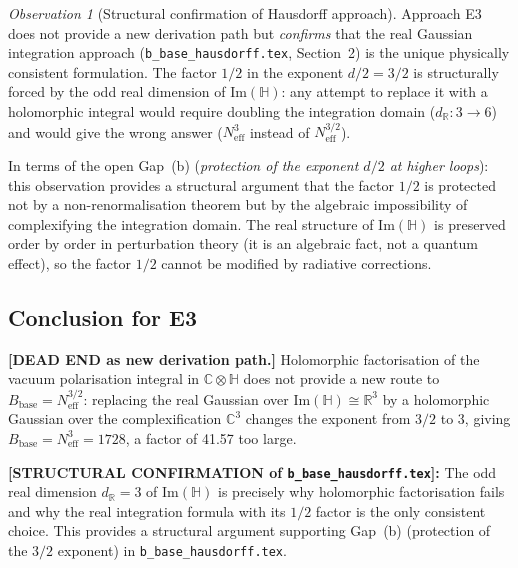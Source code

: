 \documentclass[11pt,a4paper]{article}
\theoremstyle{definition}
\theoremstyle{remark}
\newtheorem{observation}{Observation}
\begin{document}
\begin{observation}[Structural confirmation of Hausdorff approach]
\label{obs:E3_confirmation}
  Approach E3 does not provide a new derivation path but \emph{confirms}
  that the real Gaussian integration approach (\texttt{b\_base\_hausdorff.tex},
  Section~2) is the unique physically consistent formulation.
  The factor $1/2$ in the exponent $d/2 = 3/2$ is structurally forced
  by the odd real dimension of $\mathrm{Im}(\mathbb{H})$: any attempt to replace
  it with a holomorphic integral would require doubling the integration domain
  ($d_\mathbb{R}: 3 \to 6$) and would give the wrong answer ($N_{\mathrm{eff}}^3$
  instead of $N_{\mathrm{eff}}^{3/2}$).

  In terms of the open Gap~(b) (\textit{protection of the exponent $d/2$ at
  higher loops}): this observation provides a structural argument that the
  factor $1/2$ is protected not by a non-renormalisation theorem but by
  the algebraic impossibility of complexifying the integration domain.
  The real structure of $\mathrm{Im}(\mathbb{H})$ is preserved order by order
  in perturbation theory (it is an algebraic fact, not a quantum effect),
  so the factor $1/2$ cannot be modified by radiative corrections.
\end{observation}

\subsection{Conclusion for E3}

\textbf{[DEAD END as new derivation path.]}
Holomorphic factorisation of the vacuum polarisation integral in $\mathbb{C}\otimes\mathbb{H}$
does not provide a new route to $B_{\mathrm{base}} = N_{\mathrm{eff}}^{3/2}$:
replacing the real Gaussian over $\mathrm{Im}(\mathbb{H}) \cong \mathbb{R}^3$
by a holomorphic Gaussian over the complexification $\mathbb{C}^3$ changes the
exponent from $3/2$ to $3$, giving $B_{\mathrm{base}} = N_{\mathrm{eff}}^3 = 1728$,
a factor of 41.57 too large.

\textbf{[STRUCTURAL CONFIRMATION of \texttt{b\_base\_hausdorff.tex}]:}
The odd real dimension $d_\mathbb{R} = 3$ of $\mathrm{Im}(\mathbb{H})$ is
precisely why holomorphic factorisation fails and why the real integration
formula with its $1/2$ factor is the only consistent choice.
This provides a structural argument supporting Gap~(b)
(protection of the $3/2$ exponent) in \texttt{b\_base\_hausdorff.tex}.

\end{document}
